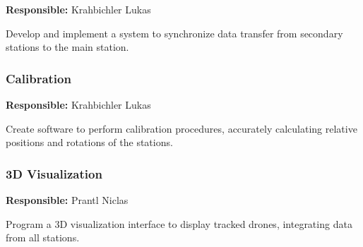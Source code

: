 \textbf{Responsible:} Krahbichler Lukas

Develop and implement a system to synchronize data transfer from secondary stations to the main station.

\subsubsection{Calibration}

\textbf{Responsible:} Krahbichler Lukas

Create software to perform calibration procedures, accurately calculating relative positions and rotations of the stations.

\subsubsection{3D Visualization}

\textbf{Responsible:} Prantl Niclas

Program a 3D visualization interface to display tracked drones, integrating data from all stations.
